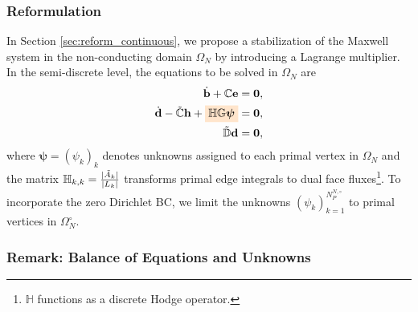 \documentclass{article}
\begin{document}
\subsubsection{Reformulation} \label{sec:reform_discrete}
In Section \ref{sec:reform_continuous}, we propose a stabilization of the Maxwell system in the non-conducting domain $\Omega_N$ by introducing a Lagrange multiplier. In the semi-discrete level, the equations to be solved in $\Omega_N$ are
\begin{subequations}
    \begin{align}
        \dot{\mathbf{b}} + \mathbb{C}\mathbf{e} &= \mathbf{0} ,\\
        \dot{\mathbf{d}} - \Tilde{\mathbb{C}}\mathbf{h} + \colorbox{orange!20}{$\mathbb{H} \mathbb{G} \bm{\psi}$}&= \mathbf{0},\\
        \Tilde{\mathbb{D}}\mathbf{d} &= \mathbf{0} \label{equ:discrete_zero_div}, 
    \end{align} 
\end{subequations}
where $\bm{\psi} = (\psi_k)_k$ denotes unknowns assigned to each primal vertex in $\Omega_N$ and the matrix $\mathbb{H}_{k,k} = \frac{|\Tilde{A}_k|}{|L_k|}$ transforms primal edge integrals to dual face fluxes\footnote{$\mathbb{H}$ functions as a discrete Hodge operator.}. To incorporate the zero Dirichlet BC, we limit the unknowns $(\psi_k)_{k=1}^{N^{N,\circ}_P}$ to primal vertices in $\Omega_N^\circ$.

\subsubsection{Remark: Balance of Equations and Unknowns}
\end{document}
